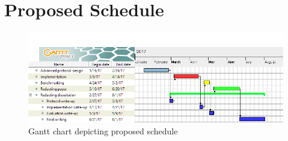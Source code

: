 \documentclass[runningheads,a4paper]{llncs}
\begin{document}
\section{Proposed Schedule} \label{Schedule}

\begin{figure}[h]
	\includegraphics[width=\textwidth,height=\textheight,keepaspectratio]{Proposal}
	\caption{Gantt chart depicting proposed schedule}
	\label{fig:proposal}
	\centering
\end{figure}
\end{document}
